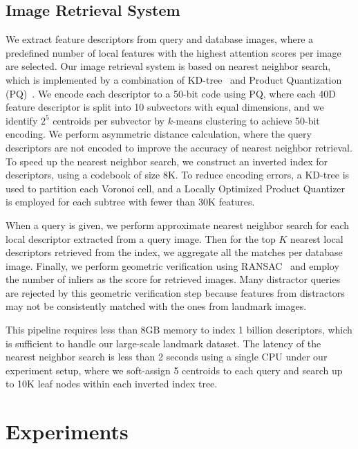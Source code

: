 \documentclass[10pt,twocolumn,letterpaper]{article}
\begin{document}
\subsection{Image Retrieval System}

We extract feature descriptors from query and database images, where a predefined number of local features with the highest attention scores per image are selected.
Our image retrieval system is based on nearest neighbor search, which is implemented by a combination of KD-tree~\cite{bentley75multidimensional} and Product Quantization (PQ)~\cite{jegou2011product}.
We encode each descriptor to a 50-bit code using PQ, where each 40D feature descriptor is split into 10 subvectors with equal dimensions, and we identify $2^5$ centroids per subvector by $k$-means clustering to achieve 50-bit encoding. 
We perform asymmetric distance calculation, where the query descriptors are not encoded to improve the accuracy of nearest neighbor retrieval.
To speed up the nearest neighbor search, we construct an inverted index for descriptors, using a codebook of size 8K.
To reduce encoding errors, a KD-tree is used to partition each Voronoi cell, and a Locally Optimized Product Quantizer \cite{kalantidis2014locally} is employed for each subtree with fewer than 30K features.





When a query is given, we perform approximate nearest neighbor search for each local descriptor extracted from a query image. 
Then for the top $K$ nearest local descriptors retrieved from the index, we aggregate all the matches per database image. 
Finally, we perform geometric verification using RANSAC~\cite{Fischler1981} and employ the number of inliers as the score for retrieved images.
Many distractor queries are rejected by this geometric verification step because features from distractors may not be consistently matched with the ones from landmark images.

This pipeline requires less than 8GB memory to index 1 billion descriptors, which is sufficient to handle our large-scale landmark dataset.
The latency of the nearest neighbor search is less than 2 seconds using a single CPU under our experiment setup, where we soft-assign 5 centroids to each query and search up to 10K leaf nodes within each inverted index tree.





 

\section{Experiments} \label{sec:experiments}
\end{document}
